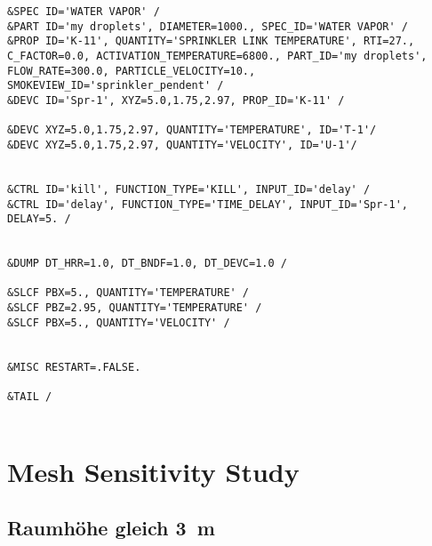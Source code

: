 \begin{lstlisting}[emptylines=0,basicstyle=\tiny]
&SPEC ID='WATER VAPOR' /
&PART ID='my droplets', DIAMETER=1000., SPEC_ID='WATER VAPOR' /
&PROP ID='K-11', QUANTITY='SPRINKLER LINK TEMPERATURE', RTI=27., C_FACTOR=0.0, ACTIVATION_TEMPERATURE=6800., PART_ID='my droplets', FLOW_RATE=300.0, PARTICLE_VELOCITY=10., SMOKEVIEW_ID='sprinkler_pendent' /
&DEVC ID='Spr-1', XYZ=5.0,1.75,2.97, PROP_ID='K-11' /

&DEVC XYZ=5.0,1.75,2.97, QUANTITY='TEMPERATURE', ID='T-1'/
&DEVC XYZ=5.0,1.75,2.97, QUANTITY='VELOCITY', ID='U-1'/


&CTRL ID='kill', FUNCTION_TYPE='KILL', INPUT_ID='delay' /
&CTRL ID='delay', FUNCTION_TYPE='TIME_DELAY', INPUT_ID='Spr-1', DELAY=5. /


&DUMP DT_HRR=1.0, DT_BNDF=1.0, DT_DEVC=1.0 /

&SLCF PBX=5., QUANTITY='TEMPERATURE' /
&SLCF PBZ=2.95, QUANTITY='TEMPERATURE' /
&SLCF PBX=5., QUANTITY='VELOCITY' /


&MISC RESTART=.FALSE.

&TAIL /


\end{lstlisting}






\section{Mesh Sensitivity Study}
\subsection*{Raumhöhe gleich 3~m}
